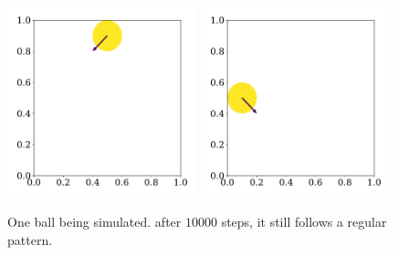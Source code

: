 \documentclass{article}
\begin{document}
    \begin{figure}
        \centering
        \includegraphics[width=0.49\textwidth]{../plots/test_case_one_particle/particle-2.pdf}
        \includegraphics[width=0.49\textwidth]{../plots/test_case_one_particle/particle-1.pdf}
        \caption{One ball being simulated. after $10 000$ steps, it still follows a regular pattern.}
    \end{figure}


    
       
\end{document}

